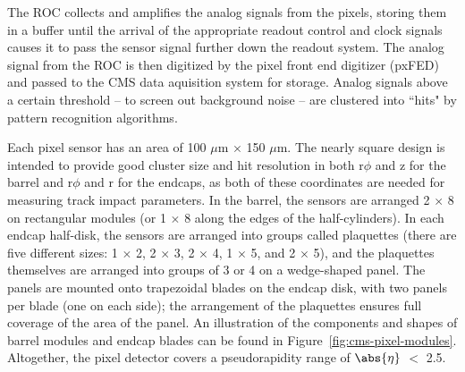 The ROC collects and amplifies the analog signals from the pixels, storing them in a buffer until the arrival of the appropriate readout control and clock signals causes it to pass the sensor signal further down the readout system. The analog signal from the ROC is then digitized by the pixel front end digitizer (pxFED) and passed to the CMS data aquisition system for storage. Analog signals above a certain threshold -- to screen out background noise -- are clustered into ``hits" by pattern recognition algorithms.

Each pixel sensor has an area of 100 $\mu$m $\times$ 150 $\mu$m. The nearly square design is intended to provide good cluster size and hit resolution in both r$\phi$ and z for the barrel and r$\phi$ and r for the endcaps, as both of these coordinates are needed for measuring track impact parameters. In the barrel, the sensors are arranged 2 $\times$ 8 on rectangular modules (or 1 $\times$ 8 along the edges of the half-cylinders). In each endcap half-disk, the sensors are arranged into groups called plaquettes (there are five different sizes: 1 $\times$ 2, 2 $\times$ 3, 2 $\times$ 4, 1 $\times$ 5, and 2 $\times$ 5), and the plaquettes themselves are arranged into groups of 3 or 4 on a wedge-shaped panel. The panels are mounted onto trapezoidal blades on the endcap disk, with two panels per blade (one on each side); the arrangement of the plaquettes ensures full coverage of the area of the panel. An illustration of the components and shapes of barrel modules and endcap blades can be found in Figure~\ref{fig:cms-pixel-modules}. Altogether, the pixel detector covers a pseudorapidity range of $\abs{\eta}$ $<$ 2.5.

